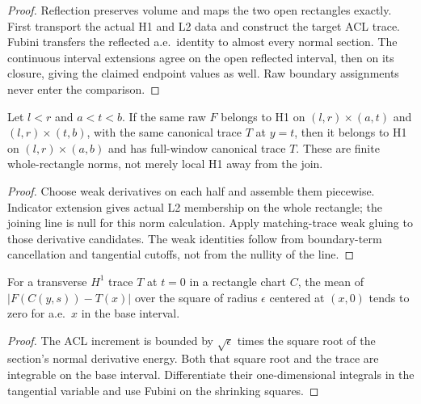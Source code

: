 \begin{proof}
\leanok
Reflection preserves volume and maps the two open rectangles exactly.
First transport the actual H1 and L2 data and construct the target ACL trace.
Fubini transfers the reflected a.e.\ identity to almost every normal section.
The continuous interval extensions agree on the open reflected interval,
then on its closure, giving the claimed endpoint values as well.
Raw boundary assignments never enter the comparison.
\end{proof}

\begin{lemma}
\label{lem:rectangle-h1-gluing}
\leanok
Let $l<r$ and $a<t<b$.
If the same raw $F$ belongs to H1 on $(l,r)\times(a,t)$ and
$(l,r)\times(t,b)$, with the same canonical trace $T$ at $y=t$,
then it belongs to H1 on $(l,r)\times(a,b)$ and has full-window
canonical trace $T$.
These are finite whole-rectangle norms, not merely local H1 away from the join.
\end{lemma}

\begin{proof}
\leanok
Choose weak derivatives on each half and assemble them piecewise.
Indicator extension gives actual L2 membership on the whole rectangle;
the joining line is null for this norm calculation.
Apply matching-trace weak gluing to those derivative candidates.
The weak identities follow from boundary-term cancellation and tangential
cutoffs, not from the nullity of the line.
\end{proof}

\begin{lemma}
\label{lem:interior-trace-square-averages}
\leanok
For a transverse $H^1$ trace $T$ at $t=0$ in a rectangle chart $C$,
the mean of $|F(C(y,s))-T(x)|$ over the square of radius $\epsilon$
centered at $(x,0)$ tends to zero for a.e.\ $x$ in the base interval.
\end{lemma}
\begin{proof}
\leanok
The ACL increment is bounded by $\sqrt{\epsilon}$ times the square root
of the section's normal derivative energy. Both that square root and
the trace are integrable on the base interval. Differentiate their
one-dimensional integrals in the tangential variable and use Fubini
on the shrinking squares.
\end{proof}

